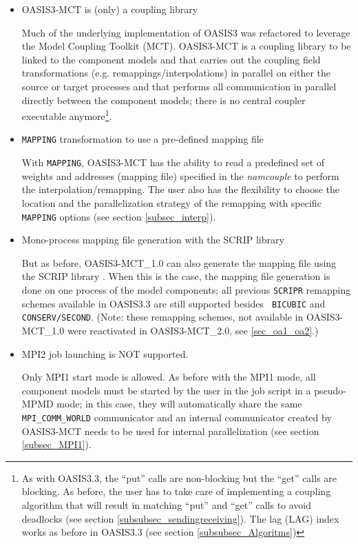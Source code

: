 \begin{itemize}
\item OASIS3-MCT is (only) a coupling library

Much of the underlying implementation of OASIS3 was refactored to
leverage the Model Coupling Toolkit (MCT). OASIS3-MCT is a coupling
library to be linked to the component models and that
carries out the coupling field transformations (e.g. remappings/interpolations)
in parallel on either the source or target processes and that performs
all communication in parallel directly between the component models; there
is no central coupler executable anymore\footnote{As with OASIS3.3,
  the ``put'' calls are non-blocking but the ``get'' calls are
blocking. As before, the user has to take care of implementing a coupling
algorithm that will result in matching ``put'' and ``get'' calls to
avoid deadlocks (see section \ref{subsubsec_sendingreceiving}). The lag (LAG) index works as
before in OASIS3.3 (see section \ref{subsubsec_Algoritms})}. 

\item {\tt MAPPING} transformation to use a pre-defined mapping file

With {\tt MAPPING}, OASIS3-MCT has the ability to read a predefined
set of weights and addresses (mapping file) specified in the {\it
  namcouple} to perform the interpolation/remapping. The user also has
the flexibility to choose the location and the parallelization strategy of the
remapping with specific {\tt MAPPING} options (see section \ref{subsec_interp}).

\item Mono-process mapping file generation with the SCRIP library

But as before, OASIS3-MCT\_1.0 can
also generate the mapping file using the SCRIP library
\citep{Jones99}. When this is the case, the mapping file generation is
done on one process of the model components; all previous {\tt SCRIPR} remapping
schemes available in OASIS3.3 are still supported besides {\tt
  BICUBIC} and {\tt CONSERV/SECOND}. (Note: these remapping schemes, not available in OASIS3-MCT\_1.0 
  were reactivated in OASIS3-MCT\_2.0, see \ref{sec_oa1_oa2}.)

\item MPI2 job launching is NOT supported. 

  Only MPI1 start mode is allowed. As before with the MPI1 mode, all
  component models must be started by the user in the job script in a
  pseudo-MPMD mode; in this case, they will automatically share the
  same {\tt MPI\_COMM\_WORLD} communicator and an internal
  communicator created by OASIS3-MCT needs to be used for internal
  parallelization (see section \ref{subsec_MPI1}).

\end{itemize}

